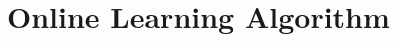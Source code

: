 \documentclass[../main.tex]{subfiles}
\begin{document}
\chapter{Online Learning Algorithm}
\end{document}
